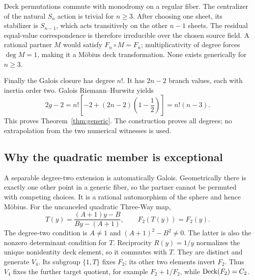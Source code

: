 Deck permutations commute with monodromy on a regular fiber. The centralizer of the natural \(S_n\) action is trivial for \(n\ge3\). After choosing one sheet, its stabilizer is \(S_{n-1}\), which acts transitively on the other \(n-1\) sheets. The residual equal-value correspondence is therefore irreducible over the chosen source field. A rational partner \(M\) would satisfy \(F_n\circ M=F_n\); multiplicativity of degree forces \(\deg M=1\), making it a Möbius deck transformation. None exists generically for \(n\ge3\).

Finally the Galois closure has degree \(n!\). It has \(2n-2\) branch values, each with inertia order two. Galois Riemann--Hurwitz yields
\begin{equation}\label{eq:RH_general}
 2g-2=n!\left[-2+(2n-2)\left(1-\frac12\right)\right]
       =n!(n-3).
\end{equation}
This proves Theorem~\ref{thm:generic}. The construction proves all degrees; no extrapolation from the two numerical witnesses is used.

\subsection{Why the quadratic member is exceptional}\label{sec:quadratic}
A separable degree-two extension is automatically Galois. Geometrically there is exactly one other point in a generic fiber, so the partner cannot be permuted with competing choices. It is a rational automorphism of the sphere and hence Möbius. For the uncanceled quadratic Three-Way map,
\begin{equation}\label{eq:quadratic_partner}
 T(y)=\frac{(A+1)y-B}{By-(A+1)},\qquad F_2(T(y))=F_2(y).
\end{equation}
The degree-two condition is \(A\ne1\) and \((A+1)^2-B^2\ne0\). The latter is also the nonzero determinant condition for \(T\). Reciprocity \(R(y)=1/y\) normalizes the unique nonidentity deck element, so it commutes with \(T\). They are distinct and generate \(V_4\). Its subgroup \(\{1,T\}\) fixes \(F_2\); its other two elements invert \(F_2\). Thus \(V_4\) fixes the further target quotient, for example \(F_2+1/F_2\), while \(\operatorname{Deck}(F_2)=C_2\).

